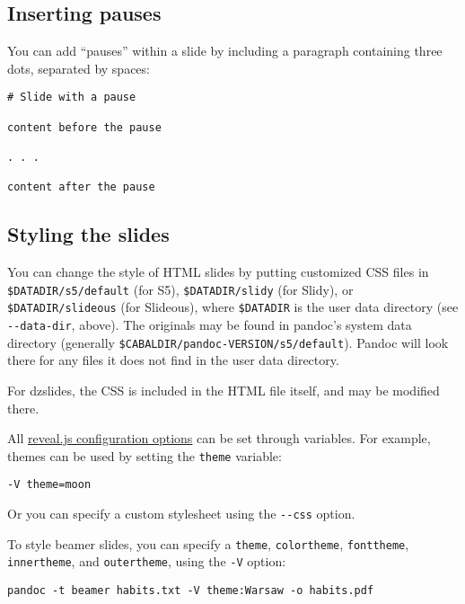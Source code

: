 \documentclass[]{article}
\begin{document}
\subsection{Inserting pauses}\label{inserting-pauses}

You can add ``pauses'' within a slide by including a paragraph
containing three dots, separated by spaces:

\begin{verbatim}
# Slide with a pause

content before the pause

. . .

content after the pause
\end{verbatim}

\subsection{Styling the slides}\label{styling-the-slides}

You can change the style of HTML slides by putting customized CSS files
in \texttt{\$DATADIR/s5/default} (for S5), \texttt{\$DATADIR/slidy} (for
Slidy), or \texttt{\$DATADIR/slideous} (for Slideous), where
\texttt{\$DATADIR} is the user data directory (see
\texttt{-\/-data-dir}, above). The originals may be found in pandoc's
system data directory (generally
\texttt{\$CABALDIR/pandoc-VERSION/s5/default}). Pandoc will look there
for any files it does not find in the user data directory.

For dzslides, the CSS is included in the HTML file itself, and may be
modified there.

All \href{https://github.com/hakimel/reveal.js\#configuration}{reveal.js
configuration options} can be set through variables. For example, themes
can be used by setting the \texttt{theme} variable:

\begin{verbatim}
-V theme=moon
\end{verbatim}

Or you can specify a custom stylesheet using the \texttt{-\/-css}
option.

To style beamer slides, you can specify a \texttt{theme},
\texttt{colortheme}, \texttt{fonttheme}, \texttt{innertheme}, and
\texttt{outertheme}, using the \texttt{-V} option:

\begin{verbatim}
pandoc -t beamer habits.txt -V theme:Warsaw -o habits.pdf
\end{verbatim}
\end{document}
